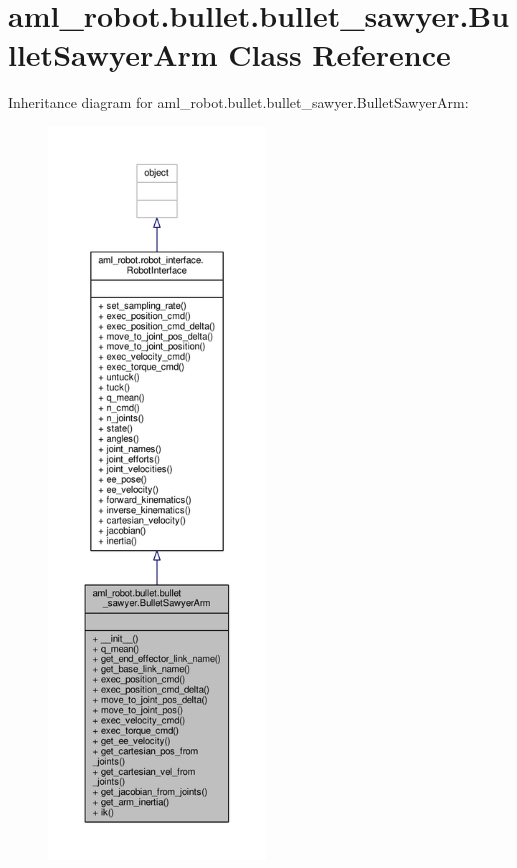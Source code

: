 \hypertarget{classaml__robot_1_1bullet_1_1bullet__sawyer_1_1_bullet_sawyer_arm}{\section{aml\-\_\-robot.\-bullet.\-bullet\-\_\-sawyer.\-Bullet\-Sawyer\-Arm Class Reference}
\label{classaml__robot_1_1bullet_1_1bullet__sawyer_1_1_bullet_sawyer_arm}
}


Inheritance diagram for aml\-\_\-robot.\-bullet.\-bullet\-\_\-sawyer.\-Bullet\-Sawyer\-Arm\-:
\nopagebreak
\begin{figure}[H]
\begin{center}
\leavevmode
\includegraphics[height=550pt]{classaml__robot_1_1bullet_1_1bullet__sawyer_1_1_bullet_sawyer_arm__inherit__graph}
\end{center}
\end{figure}


